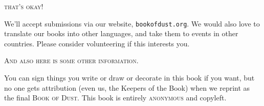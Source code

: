
\begin{center}
\booktitlefont\textsc{that's okay!}
\end{center}
\begin{center}
\parbox{4.67in}{%
\begin{bookcomment}
We'll accept submissions via our website, \texttt{bookofdust.org}. We would also love to translate our books into other languages, and take them to events in other countries. Please consider volunteering if this interests you.
\end{bookcomment}
}
\end{center}

\bigskip
\bigskip
\bigskip

\begin{center}
\booktitlefont\textsc{And also here is some other information.}
\end{center}
\begin{center}
\parbox{4.67in}{%
\begin{bookcomment}
You can sign things you write or draw or decorate in this book if you want, but no one gets attribution (even us, the Keepers of the Book) when we reprint as the final \textsc{Book of Dust}. This book is entirely \textsc{anonymous} and copyleft.
\end{bookcomment}
}
\end{center}